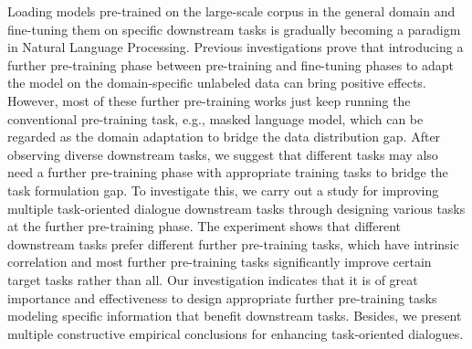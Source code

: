 Loading models pre-trained on the large-scale corpus in the general domain and fine-tuning them on specific downstream tasks is gradually becoming a paradigm in Natural Language Processing. Previous investigations prove that introducing a further pre-training phase between pre-training and fine-tuning phases to adapt the model on the domain-specific unlabeled data can bring positive effects. However, most of these further pre-training works just keep running the conventional pre-training task, e.g., masked language model, which can be regarded as the domain adaptation to bridge the data distribution gap. After observing diverse downstream tasks, we suggest that different tasks may also need a further pre-training phase with appropriate training tasks to bridge the task formulation gap. To investigate this, we carry out a study for improving multiple task-oriented dialogue downstream tasks through designing various tasks at the further pre-training phase. The experiment shows that different downstream tasks prefer different further pre-training tasks, which have intrinsic correlation and most further pre-training tasks significantly improve certain target tasks rather than all. Our investigation indicates that it is of great importance and effectiveness to design appropriate further pre-training tasks modeling specific information that benefit downstream tasks. Besides, we present multiple constructive empirical conclusions for enhancing task-oriented dialogues.
